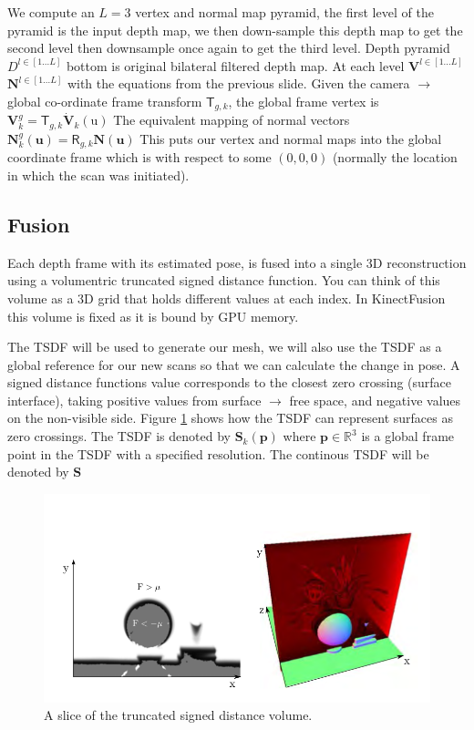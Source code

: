 \documentclass[10pt, twocolumn]{article}
\begin{document}
We compute an $L = 3$ vertex and normal map pyramid, the first level of the
pyramid is the input depth map, we then down-sample this depth map to get the
second level then downsample once again to get the third level. 
Depth pyramid $D^{l \in[1\dots L]}$ bottom is original bilateral filtered depth map. 
At each level $\textbf{V}^{l \in[1\dots L]}$ $\textbf{N}^{l \in[1\dots L]}$ with the equations from the previous slide.
Given the camera $\rightarrow$ global co-ordinate frame transform $\mathsf{T}_{g,k}$, the global frame vertex is $\textbf{V}^{g}_{k} = \mathsf{T}_{g,k} \dot{\textbf{V}}_{k}(\mathrm{u})$
The equivalent mapping of normal vectors $\mathbf{N}^{g}_{k}(\mathbf{u}) = \mathsf{R}_{g,k}\mathbf{N}(\mathbf{u})$
This puts our vertex and normal maps into the global coordinate frame which is with respect to some $(0, 0, 0)$ (normally the location in which the scan was initiated).

\subsection{Fusion} \label{sec:fusion}
Each depth frame with its estimated pose, is fused into a single 3D
reconstruction using a volumentric truncated signed distance function. You can
think of this volume as a 3D grid that holds different values at each index. In
KinectFusion this volume is fixed as it is bound by GPU memory. 

The TSDF will be used to generate our mesh, we will also use the TSDF as a global reference for our new scans so that we can calculate the change in pose. 
A signed distance functions value corresponds to the closest zero crossing (surface interface), taking positive values from surface $\rightarrow$ free space, and negative values on the non-visible side. Figure \ref{fig:tsdfslice} shows how the TSDF can represent surfaces as zero crossings.
The TSDF is denoted by $\mathbf{S}_{k}(\mathbf{p})$ where $\mathbf{p} \in \mathbb{R}^{3}$ is a global frame point in the TSDF with a specified resolution. The continous TSDF will be denoted by $\mathbf{S}$

\begin{figure}
  \centering
  \includegraphics[width=0.8\linewidth]{tsdf}
  \caption{A slice of the truncated signed distance volume.}
  \label{fig:tsdfslice}
\end{figure}
\end{document}
